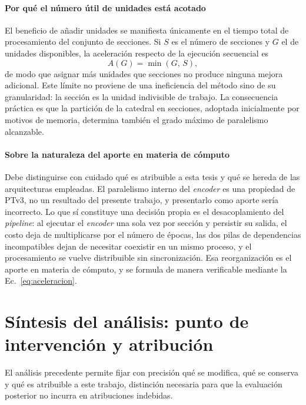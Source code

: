\paragraph*{Por qué el número útil de unidades está acotado}
El beneficio de añadir unidades se manifiesta únicamente en el tiempo total de
procesamiento del conjunto de secciones. Si $S$ es el número de secciones y $G$
el de unidades disponibles, la aceleración respecto de la ejecución secuencial es
\begin{equation}
A(G)=\min(G,\,S),
\label{eq:aceleracion}
\end{equation}
de modo que asignar más unidades que secciones no produce ninguna mejora
adicional. Este límite no proviene de una ineficiencia del método sino de su
granularidad: la sección es la unidad indivisible de trabajo. La consecuencia
práctica es que la partición de la catedral en secciones, adoptada inicialmente
por motivos de memoria, determina también el grado máximo de paralelismo
alcanzable.

\paragraph*{Sobre la naturaleza del aporte en materia de cómputo}
Debe distinguirse con cuidado qué es atribuible a esta tesis y qué se hereda de
las arquitecturas empleadas. El paralelismo interno del \emph{encoder} es una
propiedad de PTv3, no un resultado del presente trabajo, y presentarlo como
aporte sería incorrecto. Lo que sí constituye una decisión propia es el
desacoplamiento del \emph{pipeline}: al ejecutar el \emph{encoder} una sola vez
por sección y persistir su salida, el costo deja de multiplicarse por el número
de épocas, las dos pilas de dependencias incompatibles dejan de necesitar
coexistir en un mismo proceso, y el procesamiento se vuelve distribuible sin
sincronización. Esa reorganización es el aporte en materia de cómputo, y se
formula de manera verificable mediante la Ec.~\eqref{eq:aceleracion}.

\section{Síntesis del análisis: punto de intervención y atribución}
\label{sec:sintesis-analisis}

El análisis precedente permite fijar con precisión qué se modifica, qué se
conserva y qué es atribuible a este trabajo, distinción necesaria para que la
evaluación posterior no incurra en atribuciones indebidas.

